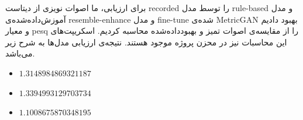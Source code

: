 \documentclass[fleqn]{report}
\begin{document}
برای ارزیابی، ما اصوات نویزی از دیتاست recorded را توسط مدل rule-based و مدل آموزش‌داده‌شده‌ی resemble-enhance و مدل fine-tune شده‌ی MetricGAN بهبود دادیم و 
معیار pesq را از مقایسه‌ی اصوات تمیز و بهبود‌داده‌شده محاسبه کردیم.
اسکریپت‌های این محاسبات نیز در محزن پروژه موجود هستند.
نتیجه‌ی ارزیابی مدل‌ها به شرح زیر می‌باشد.

\begin{itemize}
    \item \textbf{} $1.3148984869321187$
    \item \textbf{} $1.3394993129703734$
    \item \textbf{} $1.1008675870348195$
\end{itemize}
\end{document}
